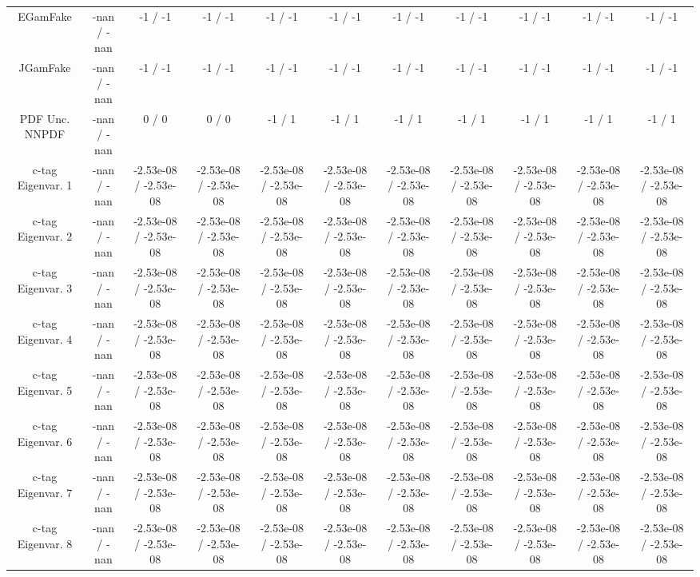 \begin{table}[htbp]
\begin{center}
\begin{tabular}{|c|c|c|c|c|c|c|c|c|c|c|}
  EGamFake & -nan / -nan & -1 / -1 & -1 / -1 & -1 / -1 & -1 / -1 & -1 / -1 & -1 / -1 & -1 / -1 & -1 / -1 & -1 / -1 \\ 
  JGamFake & -nan / -nan & -1 / -1 & -1 / -1 & -1 / -1 & -1 / -1 & -1 / -1 & -1 / -1 & -1 / -1 & -1 / -1 & -1 / -1 \\ 
  PDF Unc. NNPDF & -nan / -nan & 0 / 0 & 0 / 0 & -1 / 1 & -1 / 1 & -1 / 1 & -1 / 1 & -1 / 1 & -1 / 1 & -1 / 1 \\ 
  c-tag Eigenvar. 1 & -nan / -nan & -2.53e-08 / -2.53e-08 & -2.53e-08 / -2.53e-08 & -2.53e-08 / -2.53e-08 & -2.53e-08 / -2.53e-08 & -2.53e-08 / -2.53e-08 & -2.53e-08 / -2.53e-08 & -2.53e-08 / -2.53e-08 & -2.53e-08 / -2.53e-08 & -2.53e-08 / -2.53e-08 \\ 
  c-tag Eigenvar. 2 & -nan / -nan & -2.53e-08 / -2.53e-08 & -2.53e-08 / -2.53e-08 & -2.53e-08 / -2.53e-08 & -2.53e-08 / -2.53e-08 & -2.53e-08 / -2.53e-08 & -2.53e-08 / -2.53e-08 & -2.53e-08 / -2.53e-08 & -2.53e-08 / -2.53e-08 & -2.53e-08 / -2.53e-08 \\ 
  c-tag Eigenvar. 3 & -nan / -nan & -2.53e-08 / -2.53e-08 & -2.53e-08 / -2.53e-08 & -2.53e-08 / -2.53e-08 & -2.53e-08 / -2.53e-08 & -2.53e-08 / -2.53e-08 & -2.53e-08 / -2.53e-08 & -2.53e-08 / -2.53e-08 & -2.53e-08 / -2.53e-08 & -2.53e-08 / -2.53e-08 \\ 
  c-tag Eigenvar. 4 & -nan / -nan & -2.53e-08 / -2.53e-08 & -2.53e-08 / -2.53e-08 & -2.53e-08 / -2.53e-08 & -2.53e-08 / -2.53e-08 & -2.53e-08 / -2.53e-08 & -2.53e-08 / -2.53e-08 & -2.53e-08 / -2.53e-08 & -2.53e-08 / -2.53e-08 & -2.53e-08 / -2.53e-08 \\ 
  c-tag Eigenvar. 5 & -nan / -nan & -2.53e-08 / -2.53e-08 & -2.53e-08 / -2.53e-08 & -2.53e-08 / -2.53e-08 & -2.53e-08 / -2.53e-08 & -2.53e-08 / -2.53e-08 & -2.53e-08 / -2.53e-08 & -2.53e-08 / -2.53e-08 & -2.53e-08 / -2.53e-08 & -2.53e-08 / -2.53e-08 \\ 
  c-tag Eigenvar. 6 & -nan / -nan & -2.53e-08 / -2.53e-08 & -2.53e-08 / -2.53e-08 & -2.53e-08 / -2.53e-08 & -2.53e-08 / -2.53e-08 & -2.53e-08 / -2.53e-08 & -2.53e-08 / -2.53e-08 & -2.53e-08 / -2.53e-08 & -2.53e-08 / -2.53e-08 & -2.53e-08 / -2.53e-08 \\ 
  c-tag Eigenvar. 7 & -nan / -nan & -2.53e-08 / -2.53e-08 & -2.53e-08 / -2.53e-08 & -2.53e-08 / -2.53e-08 & -2.53e-08 / -2.53e-08 & -2.53e-08 / -2.53e-08 & -2.53e-08 / -2.53e-08 & -2.53e-08 / -2.53e-08 & -2.53e-08 / -2.53e-08 & -2.53e-08 / -2.53e-08 \\ 
  c-tag Eigenvar. 8 & -nan / -nan & -2.53e-08 / -2.53e-08 & -2.53e-08 / -2.53e-08 & -2.53e-08 / -2.53e-08 & -2.53e-08 / -2.53e-08 & -2.53e-08 / -2.53e-08 & -2.53e-08 / -2.53e-08 & -2.53e-08 / -2.53e-08 & -2.53e-08 / -2.53e-08 & -2.53e-08 / -2.53e-08 \\ 

\end{tabular}
\end{center}
\end{table}
